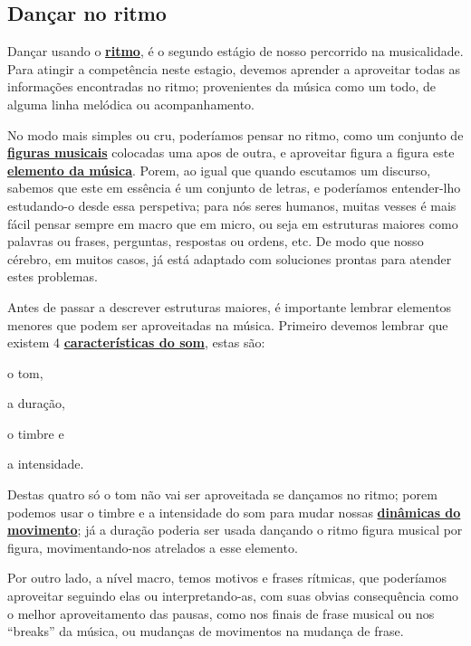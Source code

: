 \subsection{Dançar no ritmo}
\label{subsec:dancaritmo}
 Dançar usando o \hyperref[sec:pos:Ritmo]{\textbf{ritmo}},
é o segundo estágio de nosso percorrido na musicalidade.
Para atingir a competência neste estagio, 
devemos aprender a aproveitar todas as informações encontradas 
no ritmo; provenientes da música como um todo, de alguma linha melódica ou acompanhamento.

No modo mais simples ou cru, poderíamos pensar no ritmo,
como um conjunto de \hyperref[sec:figurasmusicais]{\textbf{figuras musicais}} 
colocadas uma apos de outra, 
e aproveitar figura a figura este \hyperref[sec:elementosmusica]{\textbf{elemento da música}}.
Porem, ao igual que quando escutamos um discurso,
sabemos que este em essência é um conjunto de letras,
e poderíamos entender-lho estudando-o desde essa perspetiva;
para nós seres humanos, 
muitas vesses é mais fácil pensar sempre em macro que em micro,
ou seja em estruturas maiores como palavras ou frases, perguntas, respostas ou ordens, etc. 
De modo que nosso cérebro, em muitos casos, 
já está adaptado com soluciones prontas para atender estes problemas.

Antes de passar a descrever estruturas maiores, 
é importante lembrar elementos menores que podem ser aproveitadas na música.
Primeiro devemos lembrar que existem 4 \hyperref[sec:carateristasom]{\textbf{características do som}},
estas são: 
\begin{inparaitem}
\item o tom, 
\item a duração, 
\item o timbre e 
\item a intensidade.
\end{inparaitem}
Destas quatro só o tom não vai ser aproveitada se dançamos no ritmo;
porem podemos usar o timbre e a intensidade do som para mudar nossas 
\hyperref[sec:musicalidade:dinamicas]{\textbf{dinâmicas do movimento}};
já a duração poderia ser usada dançando o ritmo figura musical por figura,
movimentando-nos atrelados a esse elemento.

Por outro lado, a nível macro, temos  motivos e frases rítmicas,
que poderíamos aproveitar seguindo elas ou interpretando-as, 
com suas obvias consequência como o melhor aproveitamento das pausas, 
como nos finais de frase musical ou nos ``breaks'' da música,
ou mudanças de movimentos na mudança de frase.

